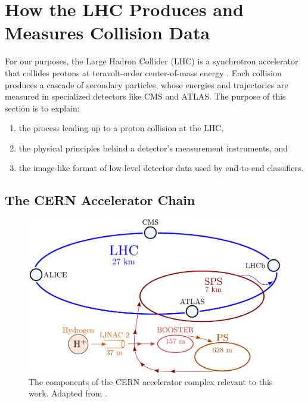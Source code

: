 \documentclass[11pt, a4paper]{article}
\begin{document}
\section{How the LHC Produces and Measures Collision Data}
For our purposes, the Large Hadron Collider (LHC) is a synchrotron accelerator that collides protons at teravolt-order center-of-mass energy \cite{lhc}. Each collision produces a cascade of secondary particles, whose energies and trajectories are measured in specialized detectors like CMS and ATLAS. The purpose of this section is to explain:
\begin{enumerate}

    \item the process leading up to a proton collision at the LHC,

    \item the physical principles behind a detector's measurement instruments, and

    \item the image-like format of low-level detector data used by end-to-end classifiers. %


\end{enumerate}

\subsection{The CERN Accelerator Chain}

\begin{figure}[htb!]
    \centering
    \includegraphics[width=0.75\linewidth]{vector/cern-complex.pdf}
    \caption{The components of the CERN accelerator complex relevant to this work. Adapted from \cite{image-cern-complex}.}
    \label{fig:cern-complex}
\end{figure}
\end{document}
